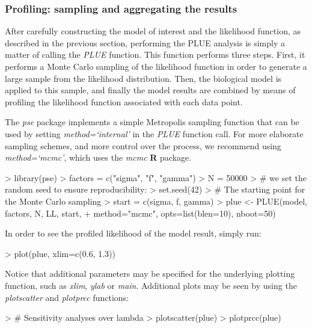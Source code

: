 \documentclass[twoside,12pt,a4paper]{article}
\newcommand{\R}{\textnormal{\sffamily\bfseries R}\xspace}
\begin{document}
\subsubsection{Profiling: sampling and aggregating the results}
After carefully constructing the model of interest and the likelihood function, as described in the 
previous section, performing the PLUE analysis is simply a matter of calling the {\em PLUE} function.
This function performs three steps. First, it performs a Monte Carlo sampling of the likelihood function
in order to generate a large sample from the likelihood distribution. Then, the biological model is applied
to this sample, and finally the model results are combined by means of profiling the likelihood function
associated with each data point.

The {\em pse} package implements a simple Metropolis sampling function that can be used
by setting {\em method=`internal'} in the {\em PLUE} function call. For more elaborate sampling schemes, 
and more control over the process, we recommend using {\em method=`mcmc'}, which uses the {\em mcmc} \R 
package.

\begin{Schunk}
\begin{Sinput}
> library(pse)
> factors = c("sigma", "f", "gamma")
> N = 50000
> # we set the random seed to ensure reproducibility:
> set.seed(42)
> # The starting point for the Monte Carlo sampling
> start = c(sigma, f, gamma)
> plue <- PLUE(model, factors, N, LL, start, 
+              method="mcmc", opts=list(blen=10), nboot=50)
\end{Sinput}
\end{Schunk}

In order to see the profiled likelihood of the model result, simply run:
\begin{Schunk}
\begin{Sinput}
> plot(plue, xlim=c(0.6, 1.3))
\end{Sinput}
\end{Schunk}

Notice that additional parameters may be specified for the underlying plotting function, such as
{\em xlim}, {\em ylab} or {\em main}. Additional plots may be seen by using the 
{\em plotscatter} and {\em plotprcc} functions:
\begin{Schunk}
\begin{Sinput}
> # Sensitivity analyses over lambda
> plotscatter(plue)
> plotprcc(plue)
\end{Sinput}
\end{Schunk}
\end{document}
